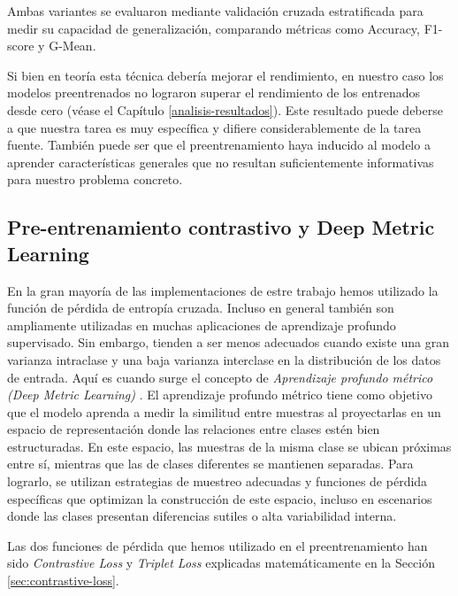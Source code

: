 Ambas variantes se evaluaron mediante validación cruzada estratificada para medir su capacidad de generalización, comparando métricas como Accuracy, F1-score y G-Mean. 

Si bien en teoría esta técnica debería mejorar el rendimiento, en nuestro caso los modelos preentrenados no lograron superar el rendimiento de los entrenados desde cero (véase el Capítulo \ref{analisis-resultados}). Este resultado puede deberse a que nuestra tarea es muy específica y difiere considerablemente de la tarea fuente. También puede ser que el preentrenamiento haya inducido al modelo a aprender características generales que no resultan suficientemente informativas para nuestro problema concreto.

\subsection{Pre-entrenamiento contrastivo y Deep Metric Learning} \label{subsec:pre-contrastivo}

En la gran mayoría de las implementaciones de estre trabajo hemos utilizado la función de pérdida de entropía cruzada. Incluso en general también son ampliamente utilizadas en muchas aplicaciones de aprendizaje profundo supervisado. Sin embargo, tienden a ser menos adecuados cuando existe una gran varianza intraclase y una baja varianza interclase en la distribución de los datos de entrada. Aquí es cuando surge el concepto de  \textit{Aprendizaje profundo métrico (Deep Metric Learning)} \parencite{mohan2023deep}. El aprendizaje profundo métrico tiene como objetivo que el modelo aprenda a medir la similitud entre muestras al proyectarlas en un espacio de representación donde las relaciones entre clases estén bien estructuradas. En este espacio, las muestras de la misma clase se ubican próximas entre sí, mientras que las de clases diferentes se mantienen separadas. Para lograrlo, se utilizan estrategias de muestreo adecuadas y funciones de pérdida específicas que optimizan la construcción de este espacio, incluso en escenarios donde las clases presentan diferencias sutiles o alta variabilidad interna.

Las dos funciones de pérdida que hemos utilizado en el preentrenamiento han sido \textit{Contrastive Loss} y \textit{Triplet Loss} explicadas matemáticamente en la Sección \ref{sec:contrastive-loss}.


